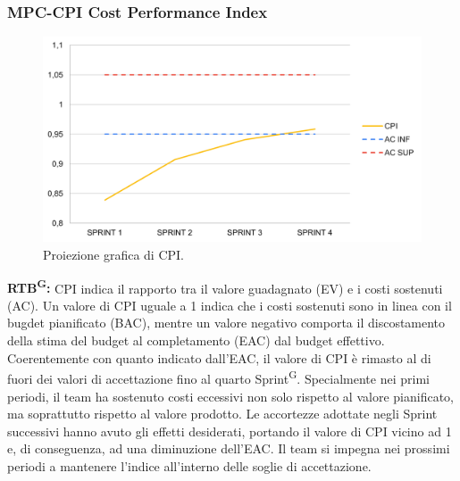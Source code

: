 \documentclass[8pt]{article}
\newcommand{\glossterm}[1]{#1\textsuperscript{G}} %
\begin{document}
\subsubsection{MPC-CPI Cost Performance Index}
\begin{figure}[h!]
    \centering
    \includegraphics[width=1\textwidth]{images_pdq/CPI.png}
    \caption{Proiezione grafica di CPI.}
    \label{fig:Proiezione grafica di CPI}
\end{figure}
\textbf{\glossterm{RTB}:} CPI indica il rapporto tra il valore guadagnato (EV) e i costi sostenuti (AC). Un valore di CPI uguale a 1 indica che i costi sostenuti sono in linea con il bugdet pianificato (BAC), mentre un valore negativo comporta il discostamento della stima del budget al completamento (EAC) dal budget effettivo.\\
Coerentemente con quanto indicato dall'EAC, il valore di CPI è rimasto al di fuori dei valori di accettazione fino al quarto \glossterm{Sprint}. Specialmente nei primi periodi, il team ha sostenuto costi eccessivi non solo rispetto al valore pianificato, ma soprattutto rispetto al valore prodotto. Le accortezze adottate negli Sprint successivi hanno avuto gli effetti desiderati, portando il valore di CPI vicino ad 1 e, di conseguenza, ad una diminuzione dell'EAC. Il team si impegna nei prossimi periodi a mantenere l'indice all'interno delle soglie di accettazione.  
\clearpage
\end{document}
